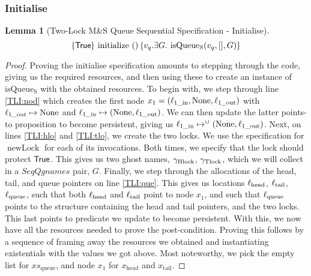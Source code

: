 \documentclass[a4paper, 10pt]{report}
\theoremstyle{definition}
\newtheorem{lemma}[theorem]{Lemma}
\newcommand{\newLock}{\operatorname{newLock}}
\newcommand{\initialise}{\operatorname{initialize}}
\newcommand{\msq}{M\&S Queue}
\newcommand{\tlmsq}{Two-Lock \msq{}}
\newcommand{\isqueueseq}{\operatorname{isQueue_{S}}}
\newcommand{\SeqQgnames}{SeqQgnames}
\newcommand{\vq}{v_q}
\newcommand{\xsqueue}{xs_{\mathrm{queue}}}
\newcommand{\locinM}[1]{\loc_{#1\_\mathrm{in}}}
\newcommand{\locoutM}[1]{\loc_{#1\_\mathrm{out}}}
\newcommand{\locN}[1]{\loc_{\mathrm{#1}}}
\newcommand{\lochead}{\locN{head}}
\newcommand{\loctail}{\locN{tail}}
\newcommand{\locqueue}{\locN{queue}}
\newcommand{\node}{x}
\newcommand{\nodeM}[1]{\node_{#1}}
\newcommand{\nodeN}[1]{\node_{\mathrm{#1}}}
\newcommand{\nodehead}{\nodeN{head}}
\newcommand{\nodetail}{\nodeN{tail}}
\newcommand{\Qg}{G}
\newcommand{\ghlock}{\gname_{\mathrm{Hlock}}}
\newcommand{\gtlock}{\gname_{\mathrm{Tlock}}}
\newcommand{\seqspecinitHTGen}[2]{\hoare{\TRUE}{\initialise \ \TT}{#1 . \Exists #2. \isqueueseq(#1, [], #2)}}
\newcommand{\seqspecinitGen}[2]{\seqspecinitHTGen{#1}{#2}}
\newcommand{\seqspecinit}{\seqspecinitGen{\vq}{\Qg}}
\begin{document}
\subsubsection{Initialise}
\begin{lemma}[\tlmsq{} Sequential Specification - Initialise]\label{TLMSQ:spec:seq:init}
  \begin{equation*}
    \seqspecinit
  \end{equation*}
\end{lemma}
\begin{proof}
Proving the initialise specification amounts to stepping through the code, giving us the required resources, and then using these to create an instance of $\isqueueseq$ with the obtained resources. To begin with, we step through line \ref{TLI:nod} which creates the first node $\nodeM{1} = (\locinM{1}, \None, \locoutM{1})$ with $\locoutM{1} \mapsto \None$ and $\locinM{1} \mapsto (\None, \locoutM{1})$. We can then update the latter points-to proposition to become persistent, giving us $\locinM{1} \mapsto^{\persistently} (\None, \locoutM{1})$. Next, on lines \ref{TLI:hlo} and \ref{TLI:tlo}, we create the two locks. We use the specification for $\newLock$ for each of its invocations. Both times, we specify that the lock should protect $\textsf{True}$. This gives us two ghost names, $\ghlock$, $\gtlock$, which we will collect in a $\SeqQgnames$ pair, $\Qg$.
Finally, we step through the allocations of the head, tail, and queue pointers on line \ref{TLI:que}. This gives us locations $\lochead$, $\loctail$, $\locqueue$, such that both $\lochead$ and $\loctail$ point to node $\nodeM{1}$, and such that $\locqueue$ points to the structure containing the head and tail pointers, and the two locks. This last points to predicate we update to become persistent.
With this, we now have all the resources needed to prove the post-condition. Proving this follows by a sequence of framing away the resources we obtained and instantiating existentials with the values we got above. Most noteworthy, we pick the empty list for $\xsqueue$, and node $\nodeM{1}$ for $\nodehead$ and $\nodetail$.
\end{proof}
\end{document}
